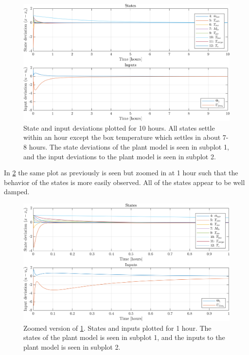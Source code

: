 \begin{figure}[h!]
	\centering
	\includegraphics[width=1\textwidth]{Graphics/fig_stateInput10h.png}
	\caption{State and input deviations plotted for 10 hours. All states settle within an hour except the box temperature which settles in about 7-8 hours. The state deviations of the plant model is seen in subplot 1, and the input deviations to the plant model is seen in subplot 2.}
	\label{fig:sim_stateInput10h}
\end{figure}

\newpage
\noindent In \cref{fig:sim_stateInput1h} the same plot as previously is seen but zoomed in at 1 hour such that the behavior of the states is more easily observed. All of the states appear to be well damped.

\begin{figure}[h!]
	\centering
	\includegraphics[width=1\textwidth]{Graphics/fig_stateInput1h.png}
	\caption{Zoomed version of \cref{fig:sim_stateInput10h}. States and inputs plotted for 1 hour. The states of the plant model is seen in subplot 1, and the inputs to the plant model is seen in subplot 2.}
	\label{fig:sim_stateInput1h}
\end{figure}

